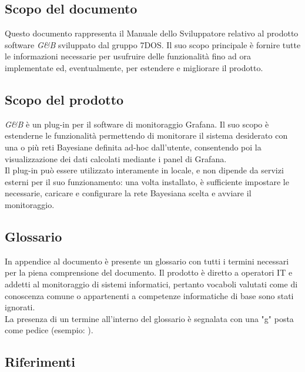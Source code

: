 \subsection{Scopo del documento}
Questo documento rappresenta il Manuale dello Sviluppatore relativo al prodotto software \emph{G\&B} sviluppato dal gruppo 7DOS. Il suo scopo principale è fornire tutte le informazioni necessarie per usufruire delle funzionalità fino ad ora implementate ed, eventualmente, per estendere e migliorare il prodotto.
\subsection{Scopo del prodotto}
\emph{G\&B} è un plug-in per il software di monitoraggio Grafana. Il suo scopo è estenderne le funzionalità permettendo di monitorare il sistema desiderato con una o più reti Bayesiane definita ad-hoc dall'utente, consentendo poi la visualizzazione dei dati calcolati mediante i panel di Grafana.
\\
Il plug-in può essere utilizzato interamente in locale, e non dipende da servizi esterni per il suo funzionamento: una volta installato, è sufficiente impostare le  necessarie, caricare e configurare la rete Bayesiana scelta e avviare il monitoraggio.

\subsection{Glossario}
In appendice al documento è presente un glossario con tutti i termini necessari per la piena comprensione del documento. Il prodotto è diretto a operatori IT e addetti al monitoraggio di sistemi informatici, pertanto vocaboli valutati come di conoscenza comune o appartenenti a competenze informatiche di base sono stati ignorati.\\
La presenza di un termine all'interno del glossario è segnalata con una "g" posta come pedice (esempio: ).

\subsection{Riferimenti}
